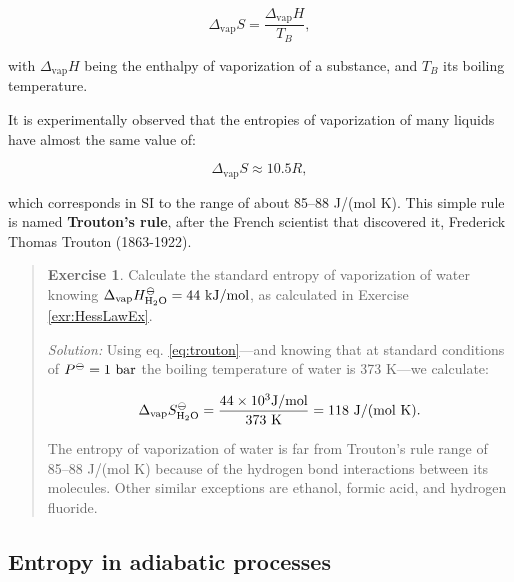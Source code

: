 \documentclass[
  9pt,
]{extbook}
\theoremstyle{definition}
\theoremstyle{definition}
\theoremstyle{definition}
\newtheorem{exercise}{Exercise}[chapter]
\theoremstyle{remark}
\begin{document}
\begin{equation}
\Delta_{\mathrm{vap}} S = \frac{\Delta_{\mathrm{vap}}H}{T_B},
\label{eq:spc}
\end{equation}

with \(\Delta_{\mathrm{vap}}H\) being the enthalpy of vaporization of a substance, and \(T_B\) its boiling temperature.

It is experimentally observed that the entropies of vaporization of many liquids have almost the same value of:

\begin{equation}
\Delta_{\mathrm{vap}} S \approx 10.5 R,
\label{eq:trouton}
\end{equation}

which corresponds in SI to the range of about 85--88 J/(mol K). This simple rule is named \textbf{Trouton's rule}, after the French scientist that discovered it, Frederick Thomas Trouton (1863-1922).

\begin{quote}
\begin{exercise}
\protect\hypertarget{exr:troutonex}{}{\label{exr:troutonex} }Calculate the standard entropy of vaporization of water knowing \(\Delta_{\mathrm{vap}} H_{\mathrm{H}_2\mathrm{O}}^{-\kern-6pt{\ominus}\kern-6pt-}= 44 \  \text{kJ/mol}\), as calculated in Exercise \ref{exr:HessLawEx}.

\emph{Solution:} Using eq. \eqref{eq:trouton}---and knowing that at standard conditions of \(P^{-\kern-6pt{\ominus}\kern-6pt-}= 1 \  \text{bar}\) the boiling temperature of water is 373 K---we calculate:

\begin{equation}
\Delta_{\mathrm{vap}} S_{\mathrm{H}_2\mathrm{O}}^{-\kern-6pt{\ominus}\kern-6pt-}= \frac{44 \times 10^3 \text{J/mol}}{373 \ \text{K}} = 118 \  \text{J/(mol K)}.
\label{eq:trouton1}
\end{equation}

The entropy of vaporization of water is far from Trouton's rule range of 85--88 J/(mol K) because of the hydrogen bond interactions between its molecules. Other similar exceptions are ethanol, formic acid, and hydrogen fluoride.
\end{exercise}
\end{quote}

\hypertarget{entropy-in-adiabatic-processes}{%
\subsection{Entropy in adiabatic processes}\label{entropy-in-adiabatic-processes}}
\end{document}
